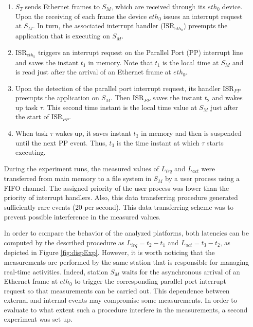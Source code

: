 \documentclass{acm_proc_article-sp}
\begin{document}
\begin{enumerate}
\item $S_T$ sends Ethernet frames to $S_M$, which are received through its $eth_0$
  device. Upon the receiving of each frame the device $eth_0$ issues an interrupt
  request at $S_M$. In turn, the associated interrupt handler (ISR$_{eth_0}$) preempts
  the application that is executing on $S_M$.

\item ISR$_{eth_0}$ triggers an interrupt request on the Parallel Port (PP)
    interrupt line and saves the instant $t_1$ in memory.  Note that $t_1$ is the
  local time at $S_M$ and is read just after the arrival of an Ethernet frame at
  $eth_0$.

\item Upon the detection of the parallel port interrupt request, its handler
  ISR$_{PP}$ preempts the application on $S_M$.  Then ISR$_{PP}$ saves the instant
  $t_2$ and wakes up task $\tau$. This second time instant is the local time value
  at $S_M$ just after the start of ISR$_{PP}$.
  
\item When task $\tau$ wakes up, it saves instant $t_3$ in memory and then is
  suspended until the next PP event. Thus, $t_3$ is the time instant at which
  $\tau$ starts executing.
\end{enumerate}

During the experiment runs, the measured values of $L_{irq}$ and $L_{act}$ were
transferred from main memory to a file system in $S_M$ by a user process using a FIFO
channel. The assigned priority of the user process was lower than the priority of
interrupt handlers.  Also, this data transferring procedure generated sufficiently rare
events (20 per second). This data transferring scheme was to prevent possible
interference in the measured values.

In order to compare the behavior of the analyzed platforms, both latencies can be
computed by the described procedure as $L_{irq} = t_2 - t_1$ and $L_{act} = t_3 -
t_2$, as depicted in Figure \ref{fig:dispExp}. However, it is worth noticing that
the measurements are performed by the same station that is responsible for managing
real-time activities. Indeed, station $S_M$ waits for the asynchronous arrival of an
Ethernet frame at $eth_0$ to trigger the corresponding parallel port interrupt
request so that measurements can be carried out. This dependence between external
and internal events may compromise some measurements. In order to evaluate to what
extent such a procedure interfere in the measurements, a second experiment was set
up.
\end{document}
